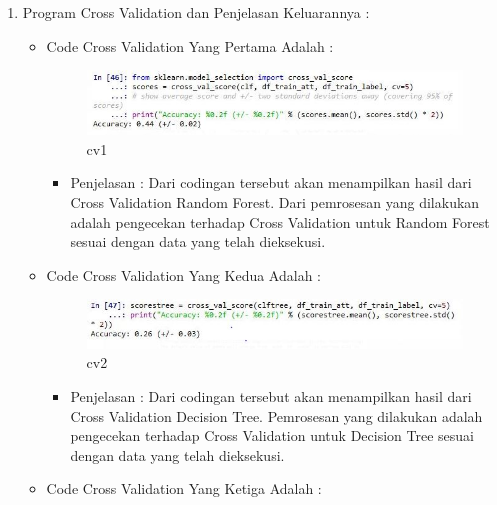 \begin{enumerate}
\par
\par
\item Program Cross Validation dan Penjelasan Keluarannya :
\begin{itemize}
\item Code Cross Validation Yang Pertama Adalah :
\par
\begin{figure}[ht]
\centering
\includegraphics[scale=0.2]{figures/cv1cahya.jpg}
\caption{cv1}
\label{contoh}
\end{figure}
\par
\begin{itemize}
\item Penjelasan : Dari codingan tersebut akan menampilkan hasil dari Cross Validation Random Forest. Dari pemrosesan yang dilakukan adalah pengecekan terhadap Cross Validation untuk Random Forest sesuai dengan data yang telah dieksekusi.
\par 
\par
\end{itemize}
\item Code Cross Validation Yang Kedua Adalah :
\par
\begin{figure}[ht]
\centering
\includegraphics[scale=0.2]{figures/cv2cahya.jpg}
\caption{cv2}
\label{contoh}
\end{figure}
\par
\begin{itemize}
\item Penjelasan : Dari codingan tersebut akan menampilkan hasil dari Cross Validation Decision Tree. Pemrosesan yang dilakukan adalah pengecekan terhadap Cross Validation untuk Decision Tree sesuai dengan data yang telah dieksekusi.
\par
\par
\end{itemize}
\item Code Cross Validation Yang Ketiga Adalah :
\par

\end{itemize}
\end{enumerate}
